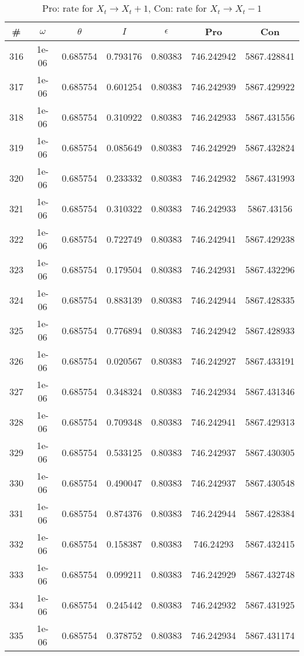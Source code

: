 \newpage
\begin{table}
\caption{Pro: rate for $X_t \rightarrow X_t + 1$, Con: rate for $X_t \rightarrow X_t - 1$}
\begin{tabular*}{\linewidth}{c|c|c|c|c|c|c}
\# & $\omega$ & $\theta$ & $I$ & $\epsilon$ & Pro & Con \\
\hline
316 & 1e-06 & 0.685754 & 0.793176 & 0.80383 & 746.242942 & 5867.428841\\
317 & 1e-06 & 0.685754 & 0.601254 & 0.80383 & 746.242939 & 5867.429922\\
318 & 1e-06 & 0.685754 & 0.310922 & 0.80383 & 746.242933 & 5867.431556\\
319 & 1e-06 & 0.685754 & 0.085649 & 0.80383 & 746.242929 & 5867.432824\\
320 & 1e-06 & 0.685754 & 0.233332 & 0.80383 & 746.242932 & 5867.431993\\
321 & 1e-06 & 0.685754 & 0.310322 & 0.80383 & 746.242933 & 5867.43156\\
322 & 1e-06 & 0.685754 & 0.722749 & 0.80383 & 746.242941 & 5867.429238\\
323 & 1e-06 & 0.685754 & 0.179504 & 0.80383 & 746.242931 & 5867.432296\\
324 & 1e-06 & 0.685754 & 0.883139 & 0.80383 & 746.242944 & 5867.428335\\
325 & 1e-06 & 0.685754 & 0.776894 & 0.80383 & 746.242942 & 5867.428933\\
326 & 1e-06 & 0.685754 & 0.020567 & 0.80383 & 746.242927 & 5867.433191\\
327 & 1e-06 & 0.685754 & 0.348324 & 0.80383 & 746.242934 & 5867.431346\\
328 & 1e-06 & 0.685754 & 0.709348 & 0.80383 & 746.242941 & 5867.429313\\
329 & 1e-06 & 0.685754 & 0.533125 & 0.80383 & 746.242937 & 5867.430305\\
330 & 1e-06 & 0.685754 & 0.490047 & 0.80383 & 746.242937 & 5867.430548\\
331 & 1e-06 & 0.685754 & 0.874376 & 0.80383 & 746.242944 & 5867.428384\\
332 & 1e-06 & 0.685754 & 0.158387 & 0.80383 & 746.24293 & 5867.432415\\
333 & 1e-06 & 0.685754 & 0.099211 & 0.80383 & 746.242929 & 5867.432748\\
334 & 1e-06 & 0.685754 & 0.245442 & 0.80383 & 746.242932 & 5867.431925\\
335 & 1e-06 & 0.685754 & 0.378752 & 0.80383 & 746.242934 & 5867.431174\\

\end{tabular*}
\end{table}
